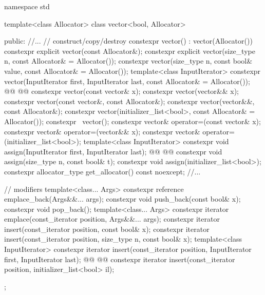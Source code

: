 \documentclass{wg21}
\begin{document}
\pnum
{}%

\begin{codeblock}
namespace std {
    template<class Allocator>
    class vector<bool, Allocator> {
        public:
        //...
        // construct/copy/destroy
        constexpr vector() : vector(Allocator()) { }
        constexpr explicit vector(const Allocator&);
        constexpr explicit vector(size_type n, const Allocator& = Allocator());
        constexpr vector(size_type n, const bool& value, const Allocator& = Allocator());
        template<class InputIterator>
        constexpr vector(InputIterator first, InputIterator last, const Allocator& = Allocator());
        @@
        @@
        constexpr vector(const vector& x);
        constexpr vector(vector&& x);
        constexpr vector(const vector&, const Allocator&);
        constexpr vector(vector&&, const Allocator&);
        constexpr vector(initializer_list<bool>, const Allocator& = Allocator());
        constexpr ~vector();
        constexpr vector& operator=(const vector& x);
        constexpr vector& operator=(vector&& x);
        constexpr vector& operator=(initializer_list<bool>);
        template<class InputIterator>
        constexpr void assign(InputIterator first, InputIterator last);
        @@
        @@
        constexpr void assign(size_type n, const bool& t);
        constexpr void assign(initializer_list<bool>);
        constexpr allocator_type get_allocator() const noexcept;
        //...

        // modifiers
        template<class... Args> constexpr reference emplace_back(Args&&... args);
        constexpr void push_back(const bool& x);
        constexpr void pop_back();
        template<class... Args> constexpr iterator emplace(const_iterator position, Args&&... args);
        constexpr iterator insert(const_iterator position, const bool& x);
        constexpr iterator insert(const_iterator position, size_type n, const bool& x);
        template<class InputIterator>
        constexpr iterator insert(const_iterator position, InputIterator first, InputIterator last);
        @@
        @@
        constexpr iterator insert(const_iterator position, initializer_list<bool> il);
    };
}
\end{codeblock}%
\end{document}
